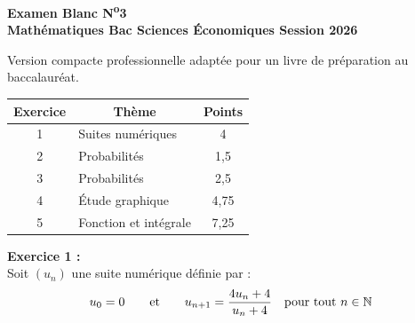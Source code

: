 
\cleardoublepage
{}
\thispagestyle{empty}

\begin{center}
  {\LARGE\bfseries\color{navy} Examen Blanc N\textsuperscript{o}3}\\[0.3cm]
  {\large\bfseries Math\'{e}matiques \textemdash{} Bac Sciences \'{E}conomiques \textemdash{} Session 2026}
\end{center}

\smallskip
{\small Version compacte professionnelle adapt\'{e}e pour un livre de pr\'{e}paration au baccalaur\'{e}at.}
\smallskip

\begin{center}
\renewcommand{\arraystretch}{1.3}
\begin{tabular}{|c|l|c|}
  \hline
  \rowcolor{navylight}
  \textbf{\color{navy}Exercice} & \multicolumn{1}{c|}{\textbf{\color{navy}Th\`{e}me}} & \textbf{\color{navy}Points} \\
  \hline
  1 & Suites num\'{e}riques & 4 \\
  \hline
  2 & Probabilit\'{e}s & 1,5 \\
  \hline
  3 & Probabilit\'{e}s & 2,5 \\
  \hline
  4 & \'{E}tude graphique & 4,75 \\
  \hline
  5 & Fonction et int\'{e}grale & 7,25 \\
  \hline
\end{tabular}
\end{center}

\bigskip

\noindent\textbf{Exercice 1 :}\\
Soit $(u_n)$ une suite num\'{e}rique d\'{e}finie par :
\[
  u_0 = 0 \qquad \text{et} \qquad
  u_{n+1} = \frac{4u_n + 4}{u_n + 4}
  \quad \text{pour tout } n \in \mathbb{N}
\]


